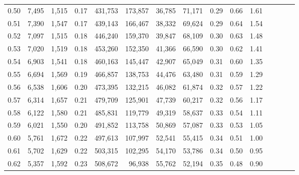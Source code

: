 \begin{tabular}{rrrcrrrrrrrrrrr}
0.50 &   7,495 &  1,515 &                                       0.17 &  431,753 &  173,857 &   36,785 &   71,171 &  0.29 &  0.66 &                         1.61 \\
0.51 &   7,390 &  1,547 &                                       0.17 &  439,143 &  166,467 &   38,332 &   69,624 &  0.29 &  0.64 &                         1.54 \\
0.52 &   7,097 &  1,515 &                                       0.18 &  446,240 &  159,370 &   39,847 &   68,109 &  0.30 &  0.63 &                         1.48 \\
0.53 &   7,020 &  1,519 &                                       0.18 &  453,260 &  152,350 &   41,366 &   66,590 &  0.30 &  0.62 &                         1.41 \\
0.54 &   6,903 &  1,541 &                                       0.18 &  460,163 &  145,447 &   42,907 &   65,049 &  0.31 &  0.60 &                         1.35 \\
0.55 &   6,694 &  1,569 &                                       0.19 &  466,857 &  138,753 &   44,476 &   63,480 &  0.31 &  0.59 &                         1.29 \\
0.56 &   6,538 &  1,606 &                                       0.20 &  473,395 &  132,215 &   46,082 &   61,874 &  0.32 &  0.57 &                         1.22 \\
0.57 &   6,314 &  1,657 &                                       0.21 &  479,709 &  125,901 &   47,739 &   60,217 &  0.32 &  0.56 &                         1.17 \\
0.58 &   6,122 &  1,580 &                                       0.21 &  485,831 &  119,779 &   49,319 &   58,637 &  0.33 &  0.54 &                         1.11 \\
0.59 &   6,021 &  1,550 &                                       0.20 &  491,852 &  113,758 &   50,869 &   57,087 &  0.33 &  0.53 &                         1.05 \\
0.60 &   5,761 &  1,672 &                                       0.22 &  497,613 &  107,997 &   52,541 &   55,415 &  0.34 &  0.51 &                         1.00 \\
0.61 &   5,702 &  1,629 &                                       0.22 &  503,315 &  102,295 &   54,170 &   53,786 &  0.34 &  0.50 &                         0.95 \\
0.62 &   5,357 &  1,592 &                                       0.23 &  508,672 &   96,938 &   55,762 &   52,194 &  0.35 &  0.48 &                         0.90 \\

\end{tabular}
